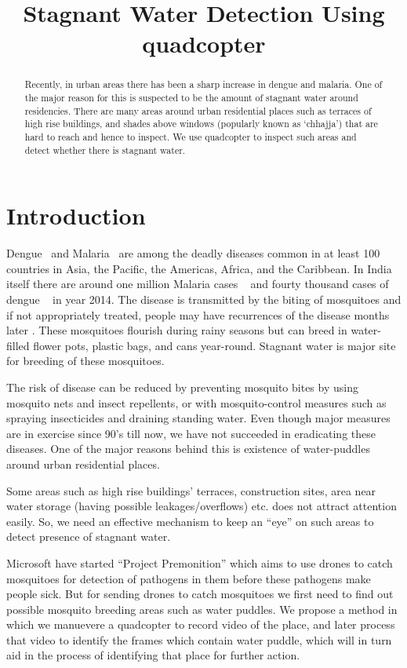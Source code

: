 \documentclass[times,10pt,twocolumn,letterpaper]{article}
\title{Stagnant Water Detection Using quadcopter}
\author{}
\begin{document}
\maketitle

\begin{abstract}
Recently, in urban areas there has been a sharp increase in dengue and malaria.
One of the major reason for this is suspected to be the amount of stagnant
water around residencies. There are many areas around urban residential places
such as terraces of high rise buildings, and shades above windows
(popularly known as `chhajja') that are hard to reach and hence to inspect. We
use quadcopter to inspect such areas and detect whether there is stagnant water.

\end{abstract}

\section{Introduction}
Dengue~\cite{WHO15Dengue} and Malaria~\cite{WHO15Malaria} are among the deadly
diseases common in at least 100 countries in Asia, the Pacific, the Americas,
Africa, and the Caribbean. In India itself there are around one million Malaria
cases ~\cite{NVBDP_Malaria} and fourty thousand cases of dengue
~\cite{NVBDP_Dengue} in year 2014. The disease is transmitted by the biting of
mosquitoes and if not appropriately treated, people may have recurrences of the
disease months later \cite{Cecilia14}. These mosquitoes flourish during rainy seasons but can breed
in water-filled flower pots, plastic bags, and cans year-round. Stagnant water
is major site for breeding of these mosquitoes.

The risk of disease can be reduced by preventing mosquito bites by using
mosquito nets and insect repellents, or with mosquito-control measures such as
spraying insecticides and draining standing water.  Even though major measures
are in exercise since 90’s till now, we have not succeeded in eradicating these
diseases. One of the major reasons behind this is existence of water-puddles
around urban residential places.

Some areas such as high rise buildings' terraces, construction sites, area
near water storage (having possible leakages/overflows) etc. does not attract
attention easily. So, we need an effective mechanism to keep an ``eye'' on such
areas to detect presence of stagnant water. 

Microsoft \cite{Microsoft15} have started ``Project Premonition'' which aims to
use drones to catch mosquitoes for detection of pathogens in them before these
pathogens make people sick. But for sending drones to catch mosquitoes we first
need to find out possible mosquito breeding areas such as water puddles. We
propose a method in which we manuevere a quadcopter to record video of the
place, and later process that video to identify the frames which contain water
puddle, which will in turn aid in the process of identifying that place for
further action.
\end{document}
